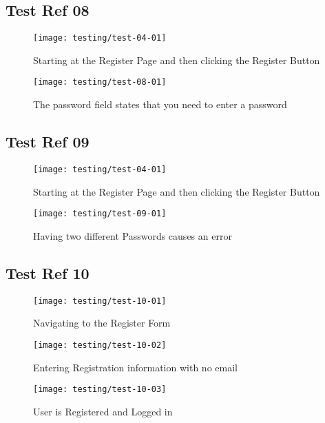 \subsection{Test Ref 08}

\begin{figure}[H]
\centering
\texttt{[image: testing/test-04-01]}
\caption{Starting at the Register Page and then clicking the Register Button}
\label{test-08-01}
\end{figure}

\begin{figure}[H]
\centering
\texttt{[image: testing/test-08-01]}
\caption{The password field states that you need to enter a password}
\label{test-08-02}
\end{figure}

\subsection{Test Ref 09}

\begin{figure}[H]
\centering
\texttt{[image: testing/test-04-01]}
\caption{Starting at the Register Page and then clicking the Register Button}
\label{test-09-01}
\end{figure}

\begin{figure}[H]
\centering
\texttt{[image: testing/test-09-01]}
\caption{Having two different Passwords causes an error}
\label{test-09-02}
\end{figure}

\subsection{Test Ref 10}

\begin{figure}[H]
\centering
\texttt{[image: testing/test-10-01]}
\caption{Navigating to the Register Form}
\label{test-10-01}
\end{figure}

\begin{figure}[H]
\centering
\texttt{[image: testing/test-10-02]}
\caption{Entering Registration information with no email}
\label{test-10-02}
\end{figure}

\begin{figure}[H]
\centering
\texttt{[image: testing/test-10-03]}
\caption{User is Registered and Logged in}
\label{test-10-03}
\end{figure}

